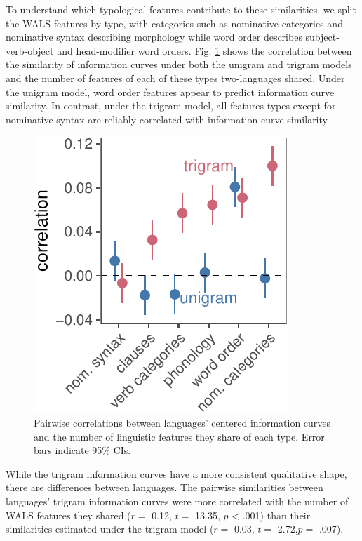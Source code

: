 \documentclass[
  english,
  man,floatsintext]{apa6}
\begin{document}
To understand which typological features contribute to these similarities, we split the WALS features by type, with categories such as nominative categories and nominative syntax describing morphology while word order describes subject-verb-object and head-modifier word orders. Fig. \ref{fig:type-cors} shows the correlation between the similarity of information curves under both the unigram and trigram models and the number of features of each of these types two-languages shared. Under the unigram model, word order features appear to predict information curve similarity. In contrast, under the trigram model, all features types except for nominative syntax are reliably correlated with information curve similarity.

\begin{figure}[tb]

{\centering \includegraphics{figs/type-cors-1} 

}

\caption{Pairwise correlations between languages' centered information curves and the number of linguistic features they share of each type. Error bars indicate 95\% CIs.}\label{fig:type-cors}
\end{figure}

While the trigram information curves have a more consistent qualitative shape, there are differences between languages. The pairwise similarities between languages' trigram information curves were more correlated with the number of WALS features they shared (\(r =\) 0.12, \(t =\) 13.35, \(p\) \textless{} .001) than their similarities estimated under the trigram model (\(r =\) 0.03, \(t =\) 2.72,\(p =\) .007).
\end{document}
